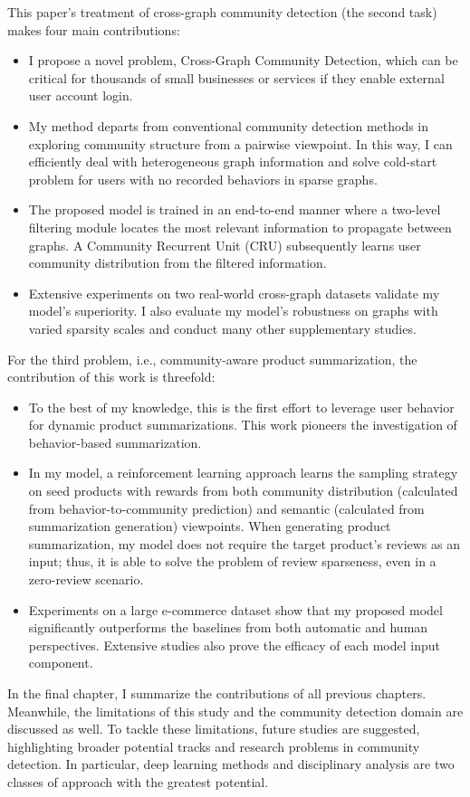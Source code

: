 This paper’s treatment of cross-graph community detection (the second task) makes four main contributions: 
\begin{itemize}
	\item I propose a novel problem, Cross-Graph Community Detection, which can be critical for thousands of small businesses or services if they enable external user account login.
	
	\item My method departs from conventional community detection methods in exploring community structure from a pairwise viewpoint. In this way, I can efficiently deal with heterogeneous graph information and solve cold-start problem for users with no recorded behaviors in sparse graphs.
	
	\item The proposed model is trained in an end-to-end manner where a two-level filtering module locates the most relevant information to propagate between graphs. A Community Recurrent Unit (CRU) subsequently learns user community distribution from the filtered information.
	
	\item Extensive experiments on two real-world cross-graph datasets validate my model’s superiority. I also evaluate my model’s robustness on graphs with varied sparsity scales and conduct many other supplementary studies.
	
\end{itemize} 

For the third problem, i.e., community-aware product summarization, the contribution of this work is threefold:

\begin{itemize}
	\item To the best of my knowledge, this is the first effort to leverage user behavior for dynamic product summarizations. This work pioneers the investigation of behavior-based summarization.
	\item In my model, a reinforcement learning approach learns the sampling strategy on seed products with rewards from both community distribution (calculated from behavior-to-community prediction) and semantic (calculated from summarization generation) viewpoints. When generating product summarization, my model does not require the target product’s reviews as an input; thus, it is able to solve the problem of review sparseness, even in a zero-review scenario.
	\item  Experiments on a large e-commerce dataset show that my proposed model significantly outperforms the baselines from both automatic and human perspectives. Extensive studies also prove the efficacy of each model input component.   
\end{itemize}

In the final chapter, I summarize the contributions of all previous chapters. Meanwhile, the limitations of this study and the community detection domain are discussed as well. To tackle these limitations, future studies are suggested, highlighting broader potential tracks and research problems in community detection. In particular, deep learning methods and disciplinary analysis are two classes of approach with the greatest potential.
 